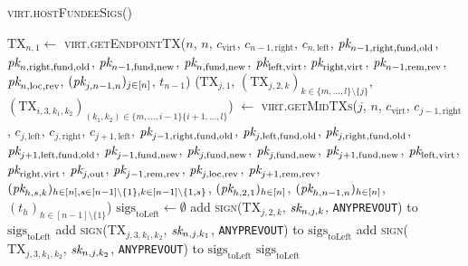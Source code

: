 \begin{center}
  \begin{processbox}{\textsc{virt.hostFundeeSigs}()}
    \begin{algorithmic}[1]
      \State $\mathrm{TX}_{n, 1} \gets$
      \textsc{virt}.\textsc{getEndpointTX}($n$, $n$, $c_{\mathrm{virt}}$,
      $c_{n-1, \mathrm{right}}$, $c_{n, \mathrm{left}}$, $\textit{pk}_{n-1,
      \mathrm{right}, \mathrm{fund}, \mathrm{old}}$, $\textit{pk}_{n, \mathrm{right},
      \mathrm{fund}, \mathrm{old}}$, $\textit{pk}_{n-1, \mathrm{fund}, \mathrm{new}}$,
      $\textit{pk}_{n, \mathrm{fund}, \mathrm{new}}$, $\textit{pk}_{\mathrm{left},
      \mathrm{virt}}$, $\textit{pk}_{\mathrm{right}, \mathrm{virt}}$, $\textit{pk}_{n-1,
      \mathrm{rem}, \mathrm{rev}}$, $\textit{pk}_{n, \mathrm{loc}, \mathrm{rev}}$,
      $(\textit{pk}_{j, n-1, n})_{j \in [n]}$, $t_{n-1}$)
      \label{code:virtual-layer:fundee-sigs:tx}
        \State ($\mathrm{TX}_{j, 1}$, $(\mathrm{TX}_{j, 2, k})_{k \in \{m,
        \dots, l\} \setminus \{j\}}$, $(\mathrm{TX}_{i, 3, k_1, k_2})_{(k_1,
        k_2) \in \{m, \dots, i-1\} \{i+1, \dots, l\}}$) $\gets$
        \textsc{virt.getMidTXs}($j$, $n$, $c_{\mathrm{virt}}$, $c_{j-1,
        \mathrm{right}}$, $c_{j, \mathrm{left}}$, $c_{j, \mathrm{right}}$,
        $c_{j+1, \mathrm{left}}$, $\textit{pk}_{j-1, \mathrm{right}, \mathrm{fund},
        \mathrm{old}}$, $\textit{pk}_{j, \mathrm{left}, \mathrm{fund}, \mathrm{old}}$,
        $\textit{pk}_{j, \mathrm{right}, \mathrm{fund}, \mathrm{old}}$, $\textit{pk}_{j+1,
        \mathrm{left}, \mathrm{fund}, \mathrm{old}}$, $\textit{pk}_{j-1, \mathrm{fund},
        \mathrm{new}}$, $\textit{pk}_{j, \mathrm{fund}, \mathrm{new}}$, $\textit{pk}_{j,
        \mathrm{fund}, \mathrm{new}}$, $\textit{pk}_{j+1, \mathrm{fund}, \mathrm{new}}$,
        $\textit{pk}_{\mathrm{left}, \mathrm{virt}}$, $\textit{pk}_{\mathrm{right},
        \mathrm{virt}}$, $\textit{pk}_{j, \mathrm{out}}$, $\textit{pk}_{j-1, \mathrm{rem},
        \mathrm{rev}}$, $\textit{pk}_{j, \mathrm{loc}, \mathrm{rev}}$, $\textit{pk}_{j+1,
        \mathrm{rem}, \mathrm{rev}}$, $(\textit{pk}_{h,s,k})_{h \in [n], s \in [n-1]
        \setminus \{1\}, k \in [n-1] \setminus \{1, s\}}$, $(\textit{pk}_{h, 2, 1})_{h
        \in [n]}$, $(\textit{pk}_{h, n-1, n})_{h \in [n]}$, $(t_h)_{h \in [n-1] \setminus
        \{1\}}$)
        \State $\mathrm{sigs}_{\mathrm{toLeft}} \gets \emptyset$
          \State add \textsc{sign}($\mathrm{TX}_{j, 2, k}$, $\textit{sk}_{n, j, k}$,
          \texttt{ANYPREVOUT}) to $\mathrm{sigs}_{\mathrm{toLeft}}$
        \EndFor
          \State add \textsc{sign}($\mathrm{TX}_{j, 3, k_1, k_2}$, $\textit{sk}_{n, j,
          k_1}$, \texttt{ANYPREVOUT}) to $\mathrm{sigs}_{\mathrm{toLeft}}$
          \State add \textsc{sign}($\mathrm{TX}_{j, 3, k_1, k_2}$, $\textit{sk}_{n, j,
          k_2}$, \texttt{ANYPREVOUT}) to $\mathrm{sigs}_{\mathrm{toLeft}}$
        \EndFor
      \EndFor
      \State \Return $\mathrm{sigs}_{\mathrm{toLeft}}$
    \end{algorithmic}
  \end{processbox}
  \label{code:virtual-layer:fundee-sigs}
\end{center} \ \\

